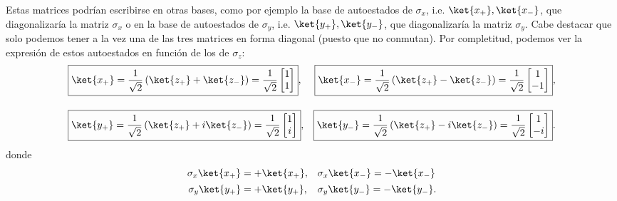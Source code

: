\documentclass[a4paper,11pt]{book} %
\numberwithin{equation}{chapter}
\def\lp{\left(}
\def\rp{\right)}
\begin{document}
Estas matrices podrían escribirse en otras bases, como por ejemplo la base de autoestados de $\sigma_x$, i.e. $\ket{x_+}, \ket{x_-}$, que diagonalizaría la matriz $\sigma_x$ o en la base de autoestados de $\sigma_y$, i.e. $\ket{y_+}, \ket{y_-}$, que diagonalizaría la matriz $\sigma_y$. Cabe destacar que solo podemos tener a la vez una de las tres matrices en forma diagonal (puesto que no conmutan). Por completitud, podemos ver la expresión de estos autoestados en función de los de $ \sigma_z$:
\begin{equation} 
\begin{aligned}
& \boxed{\ket{x_+}  = \frac{1}{\sqrt{2}} \lp \ket{z_+} + \ket{z_-} \rp = \frac{1}{\sqrt{2}} \begin{bmatrix}  1 \\ 1  \end{bmatrix}},
& \boxed{\ket{x_-}  = \frac{1}{\sqrt{2}} \lp \ket{z_+} - \ket{z_-} \rp = \frac{1}{\sqrt{2}} \begin{bmatrix}  1 \\ -1  \end{bmatrix}},   \\ \rule{0mm}{10mm}
& \boxed{\ket{y_+}  = \frac{1}{\sqrt{2}} \lp \ket{z_+} + i \ket{z_-} \rp = \frac{1}{\sqrt{2}} \begin{bmatrix}  1 \\ i  \end{bmatrix}}, 
& \boxed{\ket{y_-}   = \frac{1}{\sqrt{2}} \lp \ket{z_+} - i \ket{z_-} \rp = \frac{1}{\sqrt{2}} \begin{bmatrix}  1 \\ -i \end{bmatrix}}.
\end{aligned}
\end{equation}
donde
\begin{equation} 
\begin{aligned}
 \sigma_x \ket{x_+} & = + \ket{x_+},
 &&\sigma_x \ket{x_-}  =  - \ket{x_-}  \\ \rule{0mm}{3mm}
 \sigma_y \ket{y_+} & = + \ket{y_+},
 &&\sigma_y \ket{y_-}   = - \ket{y_-}.
\end{aligned}
\end{equation}
\end{document}
